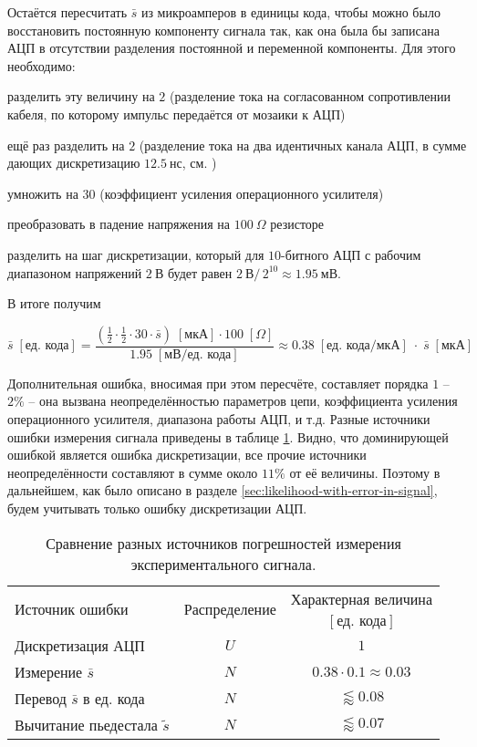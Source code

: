 Остаётся пересчитать $\bar{s}$ из микроамперов в единицы кода, чтобы можно было восстановить постоянную компоненту сигнала так, как она была бы записана АЦП в отсутствии разделения постоянной и переменной компоненты. Для этого необходимо:
\begin{enumerate*}[label=\arabic*)]
	\item разделить эту величину на $2$ (разделение тока на согласованном сопротивлении кабеля, по которому импульс передаётся от мозаики к АЦП)
	\item ещё раз разделить на $2$ (разделение тока на два идентичных канала АЦП, в сумме дающих дискретизацию $12.5~\text{нс}$, см. \cite{SphereDetector2020})
	\item умножить на $30$ (коэффициент усиления операционного усилителя)
	\item преобразовать в падение напряжения на $100~\Omega$ резисторе
	\item разделить на шаг дискретизации, который для $10$-битного АЦП с рабочим диапазоном напряжений $2~\text{В}$ будет равен $2~\text{В} / \, 2^{10} \approx 1.95~\text{мВ}$.
\end{enumerate*}
В итоге получим

\begin{equation}
	\label{eq:current-muA-to-code-units-conversion}
	\bar{s} \; [\text{ед. кода}] = \frac{\left(\frac{1}{2} \cdot \frac{1}{2} \cdot 30 \cdot \bar{s} \right) \; [ \text{мкА}] \cdot 100 \; [\Omega]}{1.95 \; [\text{мВ} / \text{ед. кода}]} \approx 0.38 \; [\text{ед. кода} / \text{мкА}] \;\cdot\; \bar{s} \; [\text{мкА}]
\end{equation}

Дополнительная ошибка, вносимая при этом пересчёте, составляет порядка $1$ -- $2\%$ -- она вызвана неопределённостью параметров цепи, коэффициента усиления операционного усилителя, диапазона работы АЦП, и т.д. Разные источники ошибки измерения сигнала приведены в таблице \ref{tab:s-measurement-errors}. Видно, что доминирующей ошибкой является ошибка дискретизации, все прочие источники неопределённости составляют в сумме около $11\%$ от её величины. Поэтому в дальнейшем, как было описано в разделе \ref{sec:likelihood-with-error-in-signal}, будем учитывать только ошибку дискретизации АЦП.

\begin{table}
	\centering
	\begin{tabular}{ |l|c|c| }
		\toprule
		\multirow{2}{*}{Источник ошибки} & \multirow{2}{*}{Распределение}
		& Характерная величина \\
		& & $[\text{ед. кода}]$ \\
		\midrule
		Дискретизация АЦП & $U$ & $1$ \\ 
		Измерение $\bar{s}$ & $N$ & $0.38 \cdot 0.1 \approx 0.03$ \\ 
		Перевод $\bar{s}$ в ед. кода & $N$ & $\lessapprox 0.08$ \\ 
		Вычитание пьедестала $\tilde{s}$ & $N$ & $\lessapprox 0.07$ \\ 
		\bottomrule
	\end{tabular}
	\caption{\label{tab:s-measurement-errors}Сравнение разных источников погрешностей измерения экспериментального сигнала.}
\end{table}

